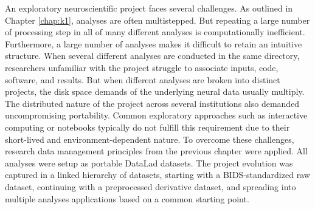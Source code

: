 An exploratory neuroscientific project faces several challenges.
As outlined in Chapter \ref{chap:k1}, analyses are often multistepped.
But repeating a large number of processing step in all of many different analyses is computationally inefficient.
Furthermore, a large number of analyses makes it difficult to retain an intuitive structure.
When several different analyses are conducted in the same directory, researchers unfamiliar with the project struggle to associate inputs, code, software, and results.
But when different analyses are broken into distinct projects, the disk space demands of the underlying neural data usually multiply.
The distributed nature of the project across several institutions also demanded uncompromising portability.
Common exploratory approaches such as interactive computing or notebooks typically do not fulfill this requirement due to their short-lived and environment-dependent nature.
To overcome these challenges, research data management principles from the previous chapter were applied.
All analyses were setup as portable DataLad datasets.
The project evolution was captured in a linked hierarchy of datasets, starting with a BIDS-standardized raw dataset, continuing with a preprocessed derivative dataset, and spreading into multiple analyses applications based on a common starting point.

